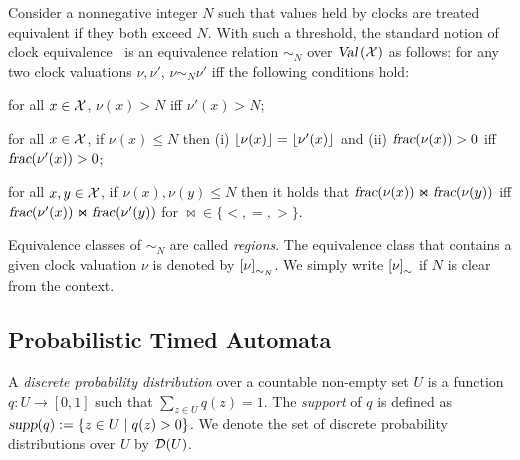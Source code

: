 \smallskip {} Consider a nonnegative integer $N$ such that
values held by clocks are treated equivalent if they both exceed $N$.
With such a threshold, the standard notion of clock equivalence~\cite{DBLP:journals/tcs/AlurD94} is an equivalence relation $\sim_N$ over $\mbox{\sl Val}\left(\mathcal{X}\right)$ as follows: for any two clock valuations $\nu,\nu'$, $\nu\sim_N\nu'$ iff the following conditions hold:
\begin{compactitem}
\item for all $x\in\mathcal{X}$, $\nu(x)>N$ iff $\nu'(x)> N$;
\item for all $x\in\mathcal{X}$, if $\nu(x)\le N$ then (i) ${\lfloor}{\nu(x)}{\rfloor}={\lfloor}{\nu'(x)}{\rfloor}$ and (ii) $\mbox{\sl frac}(\nu(x))>0$ iff $\mbox{\sl frac}(\nu'(x))>0$;
\item for all $x,y\in\mathcal{X}$, if $\nu(x),\nu(y)\le N$ then it holds that $\mbox{\sl frac}(\nu(x))\Join \mbox{\sl frac}(\nu(y))$ iff $\mbox{\sl frac}(\nu'(x))\Join \mbox{\sl frac}(\nu'(y))$ for $\Join\in\{<,=,>\}$.
\end{compactitem}
Equivalence classes of $\sim_N$ are called \emph{regions}. The equivalence class that contains a given clock valuation $\nu$ is denoted by $\left[\nu\right]_{\sim_N}$.
We simply write $\left[\nu\right]_{\sim}$ if $N$ is clear from the context.
\subsection{Probabilistic Timed Automata}

A \emph{discrete probability distribution} over a countable non-empty set $U$ is a function $q:U\rightarrow[0,1]$ such that $\sum_{z\in U}q(z)=1$.
The \emph{support} of $q$ is defined as ${\mbox{\sl supp}}(q):=\{z\in U\mid q(z)>0\}$.
We denote the set of discrete probability distributions over $U$ by ${\mathcal{D}}{\left(U\right)}$.

